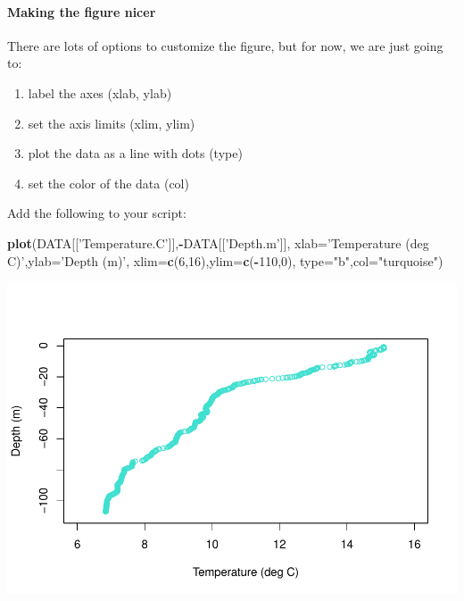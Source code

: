 \documentclass[
]{article}
\newenvironment{Shaded}{\begin{snugshade}}{\end{snugshade}}
\newcommand{\DataTypeTok}[1]{\textcolor[rgb]{0.13,0.29,0.53}{#1}}
\newcommand{\DecValTok}[1]{\textcolor[rgb]{0.00,0.00,0.81}{#1}}
\newcommand{\KeywordTok}[1]{\textcolor[rgb]{0.13,0.29,0.53}{\textbf{#1}}}
\newcommand{\NormalTok}[1]{#1}
\newcommand{\OperatorTok}[1]{\textcolor[rgb]{0.81,0.36,0.00}{\textbf{#1}}}
\newcommand{\StringTok}[1]{\textcolor[rgb]{0.31,0.60,0.02}{#1}}
\providecommand{\tightlist}{%
  \setlength{\itemsep}{0pt}\setlength{\parskip}{0pt}}
\begin{document}
\hypertarget{making-the-figure-nicer}{%
\paragraph{Making the figure nicer}\label{making-the-figure-nicer}}

There are lots of options to customize the figure, but for now, we are
just going to:

\begin{enumerate}
\def\labelenumi{\arabic{enumi}.}
\tightlist
\item
  label the axes (xlab, ylab)
\item
  set the axis limits (xlim, ylim)
\item
  plot the data as a line with dots (type)
\item
  set the color of the data (col)
\end{enumerate}

Add the following to your script:

\begin{Shaded}
\begin{Highlighting}[]
\KeywordTok{plot}\NormalTok{(DATA[[}\StringTok{'Temperature.C'}\NormalTok{]],}\OperatorTok{-}\NormalTok{DATA[[}\StringTok{'Depth.m'}\NormalTok{]],}
 \DataTypeTok{xlab=}\StringTok{'Temperature (deg C)'}\NormalTok{,}\DataTypeTok{ylab=}\StringTok{'Depth (m)'}\NormalTok{,}
 \DataTypeTok{xlim=}\KeywordTok{c}\NormalTok{(}\DecValTok{6}\NormalTok{,}\DecValTok{16}\NormalTok{),}\DataTypeTok{ylim=}\KeywordTok{c}\NormalTok{(}\OperatorTok{-}\DecValTok{110}\NormalTok{,}\DecValTok{0}\NormalTok{),}
 \DataTypeTok{type=}\StringTok{"b"}\NormalTok{,}\DataTypeTok{col=}\StringTok{"turquoise"}\NormalTok{)}
\end{Highlighting}
\end{Shaded}

\includegraphics{dataVisualization-classNotes_files/figure-latex/unnamed-chunk-14-1.pdf}
\end{document}
